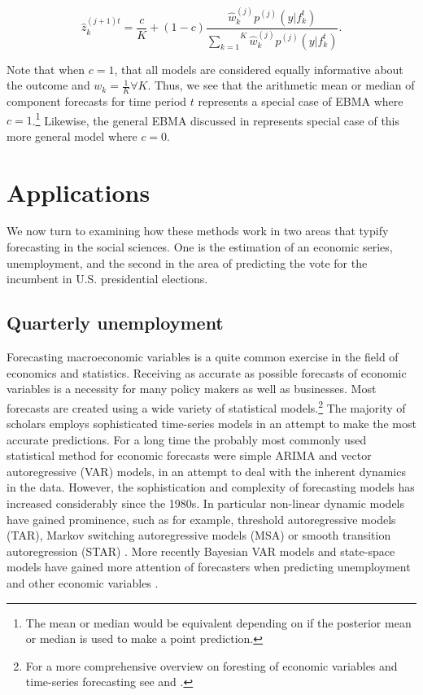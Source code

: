 \documentclass[12pt,fullpage,endnotes]{article}
\begin{document}
\begin{equation}
\hat{z}^{(j+1)t}_{k} = \frac{c}{K} + (1-c)\frac{\hat{w}^{(j)}_k
p^{(j)}(y|f_{k}^{t})}{\overset{K}{\underset{k=1}{\sum}}\hat{w}^{(j)}_kp^{(j)}(y|f_{k}^{t})}.
\end{equation}




Note that when $c=1$, that all models are considered equally
informative about the outcome and $w_k=\frac{1}{K} \forall K$. Thus, we see that the arithmetic mean or
median of component forecasts for time period $t$ represents a special
case of EBMA where $c=1$.\footnote{The mean or median would be
  equivalent depending on if the posterior mean or median is used to
  make a point prediction.}  Likewise, the general EBMA discussed in
\citet{mhw:2012} represents special case of this more general
model where $c=0$.


\section{Applications}
\label{empirics}

We now turn to examining how these methods work in two areas that typify forecasting in
the social sciences. One is the estimation of an economic series, unemployment, and the second in the area of predicting the vote for the incumbent in U.S. presidential elections.


\subsection{Quarterly unemployment}
Forecasting macroeconomic variables is a quite common exercise in the field of economics and statistics. Receiving as accurate as possible forecasts of economic variables is a necessity for many policy makers as well as businesses. Most forecasts are created using a wide variety of statistical models.\footnote{For a more comprehensive overview on foresting of economic variables and time-series forecasting see \citet{Elliott:Timmermann:2008} and \citet{Goijer:Hyndman:2006}.} 
The majority of scholars employs sophisticated time-series models in an attempt to make the most accurate predictions. For a long time the probably most commonly used statistical method for economic forecasts were simple ARIMA and vector autoregressive (VAR) models, in an attempt to deal with the inherent dynamics in the data. However, the sophistication and complexity of forecasting models has increased considerably since the 1980s. In particular non-linear dynamic models have gained prominence, such as for example, threshold autoregressive models (TAR), Markov switching autoregressive models (MSA) or smooth transition
autoregression (STAR) \citep{Elliott:Timmermann:2008,Montgomery:etal:1998}. More recently Bayesian VAR models and state-space models have gained more attention of forecasters when predicting unemployment and other economic variables \citep{Goijer:Hyndman:2006,Elliott:Timmermann:2008}. 
\end{document}
